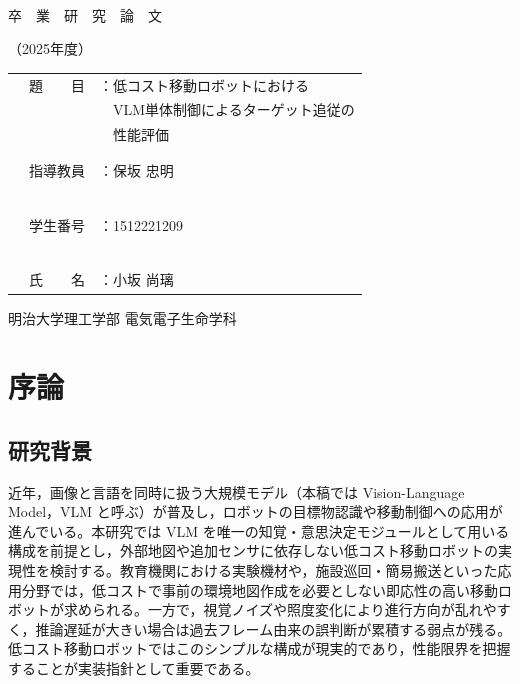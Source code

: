 \documentclass[a4paper,11pt]{ltjsreport}
\begin{document}
\begin{titlepage}
  \centering
  ~~\vspace{1cm}
 
  {\Huge 卒　業　研　究　論　文 \par}
  {\Huge （2025年度）\par}

  \vspace{8cm}

  \begin{tabular}{rl}
    {\LARGE 題　　目}　 & {\LARGE ：低コスト移動ロボットにおける} \\
                         & {\LARGE ~~VLM単体制御によるターゲット追従の} \\
                         & {\LARGE ~~性能評価} \\ \\ \\
    {\LARGE 指導教員}　 & {\LARGE ：保坂 忠明} \\　 \\ \\
    {\LARGE 学生番号}　 & {\LARGE ：1512221209} \\　 \\ \\
    {\LARGE 氏　　名}　 & {\LARGE ：小坂 尚璃}
  \end{tabular}

  \vfil
  \begin{flushright}
    明治大学理工学部 電気電子生命学科
  \end{flushright}
\end{titlepage}

\tableofcontents

\chapter{序論}
\label{chap:intro}
\section{研究背景}
近年，画像と言語を同時に扱う大規模モデル（本稿では Vision-Language Model，VLM と呼ぶ）が普及し，ロボットの目標物認識や移動制御への応用が進んでいる。本研究では VLM を唯一の知覚・意思決定モジュールとして用いる構成を前提とし，外部地図や追加センサに依存しない低コスト移動ロボットの実現性を検討する。教育機関における実験機材や，施設巡回・簡易搬送といった応用分野では，低コストで事前の環境地図作成を必要としない即応性の高い移動ロボットが求められる。一方で，視覚ノイズや照度変化により進行方向が乱れやすく，推論遅延が大きい場合は過去フレーム由来の誤判断が累積する弱点が残る。低コスト移動ロボットではこのシンプルな構成が現実的であり，性能限界を把握することが実装指針として重要である。
\end{document}
